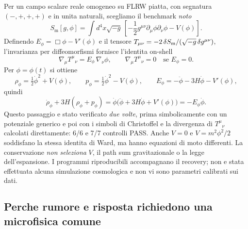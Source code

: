 \documentclass[11pt,a4paper]{article}
\begin{document}
Per un campo scalare reale omogeneo su FLRW piatta, con segnatura $(-,+,+,+)$
e in unita naturali, scegliamo il benchmark \emph{noto}
\begin{equation}
S_{\mathrm m}[g,\phi]=\int d^4x\sqrt{-g}\,
\left[-\frac12 g^{\mu\nu}\partial_\mu\phi\partial_\nu\phi
 -V(\phi)\right].
\end{equation}
Definendo $E_\phi=\Box\phi-V'(\phi)$ e il tensore
$T_{\mu\nu}=-2\,\delta S_{\rm m}/(\sqrt{-g}\,\delta g^{\mu\nu})$,
l'invarianza per diffeomorfismi fornisce l'identita on-shell
\begin{equation}
\nabla_\mu T^{\mu}{}_{\nu}=E_\phi\,\nabla_\nu\phi,
\qquad \nabla_\mu T^{\mu}{}_{\nu}=0\quad\text{se } E_\phi=0.
\end{equation}
Per $\phi=\phi(t)$ si ottiene
\begin{equation}
\rho_\phi=\tfrac12\dot\phi^2+V(\phi),\qquad
p_\phi=\tfrac12\dot\phi^2-V(\phi),\qquad
E_\phi=-\ddot\phi-3H\dot\phi-V'(\phi),
\end{equation}
quindi
\begin{equation}
\boxed{\dot\rho_\phi+3H(\rho_\phi+p_\phi)
=\dot\phi\bigl(\ddot\phi+3H\dot\phi+V'(\phi)\bigr)
=-E_\phi\dot\phi.}
\end{equation}
Questo passaggio e stato verificato \emph{due volte}, prima simbolicamente
con un potenziale generico e poi con i simboli di Christoffel e la divergenza
di $T^{\mu}{}_{\nu}$ calcolati direttamente: 6/6 e 7/7 controlli PASS.
Anche $V=0$ e $V=m^2\phi^2/2$ soddisfano la stessa identita di Ward,
ma hanno equazioni di moto differenti. La conservazione \emph{non seleziona}
$V$, il path sum gravitazionale o la legge dell'espansione. I programmi
riproducibili accompagnano il recovery; non e stata effettuata alcuna
simulazione cosmologica e non vi sono parametri calibrati sui dati.

\subsection{Perche rumore e risposta richiedono una microfisica comune}
\end{document}
